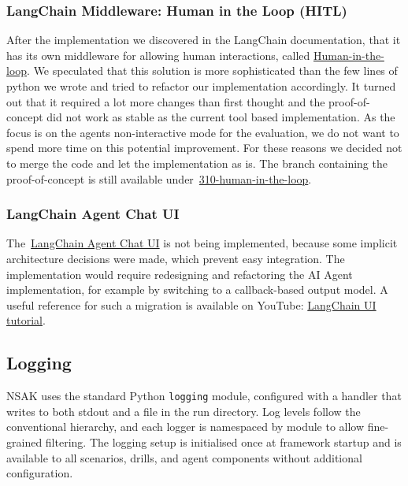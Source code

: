 \subsubsection{LangChain Middleware: Human in the Loop (HITL)}\label{subsubsec:langchain-midleware-human-in-the-loop}

After the implementation we discovered in the LangChain documentation,
that it has its own middleware for allowing human interactions,
called \href{https://docs.langchain.com/oss/python/langchain/human-in-the-loop}{Human-in-the-loop}.
We speculated that this solution is more sophisticated than the few lines of python we wrote and tried to refactor our implementation accordingly.
It turned out that it required a lot more changes than first thought
and the proof-of-concept did not work as stable as the current tool based implementation.
As the focus is on the agents non-interactive mode for the evaluation,
we do not want to spend more time on this potential improvement.
For these reasons we decided not to merge the code and let the implementation as is.
The branch containing the proof-of-concept is still available under~\href{https://gitlab.ti.bfh.ch/gausf1-vonal3/swiss-army-knife-network-sniffer/-/tree/310-human-in-the-loop?ref_type=heads}{310-human-in-the-loop}.

\subsubsection{LangChain Agent Chat UI}\label{subsubsec:langchain-agent-chat-ui}

The~\href{https://docs.langchain.com/oss/python/langchain/ui}{LangChain Agent Chat UI} is not being implemented,
because some implicit architecture decisions were made,
which prevent easy integration.
The implementation would require redesigning and refactoring the \gls{AI} Agent implementation,
for example by switching to a callback-based output model.
A useful reference for such a migration is available on YouTube: \href{https://www.youtube.com/watch?v=lInrwVnZ83o}{LangChain UI tutorial}.

\subsection{Logging}\label{subsec:ai-scenarios-implementation-logging}

\gls{NSAK} uses the standard Python \texttt{logging} module,
configured with a handler that writes to both stdout and a file in the run directory.
Log levels follow the conventional hierarchy, and each logger is namespaced by module to allow fine-grained filtering.
The logging setup is initialised once at framework startup and is available to all scenarios, drills, and agent components without additional configuration.


